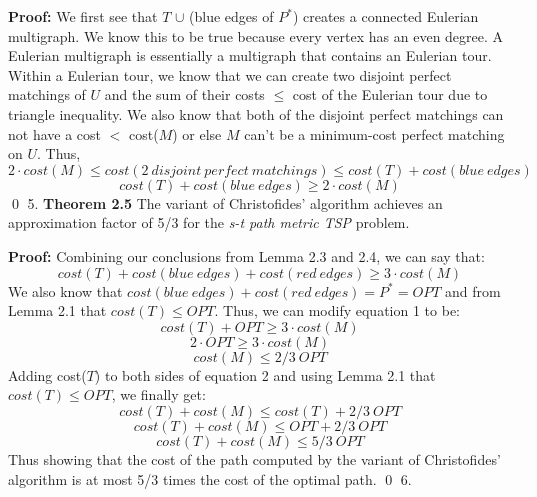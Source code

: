\documentclass[oneside]{homework} %
\begin{document}
\textbf{Proof:} We first see that $T$ $\cup$ (blue edges of $P^*$) creates a connected Eulerian multigraph. We know this to be true because every vertex has an even degree. A Eulerian multigraph is essentially a multigraph that contains an Eulerian tour. Within a Eulerian tour, we know that we can create two disjoint perfect matchings of $U$ and the sum of their costs $\leq$ cost of the Eulerian tour due to triangle inequality. We also know that both of the disjoint perfect matchings can not have a cost $<$ cost($M$) or else $M$ can't be a minimum-cost perfect matching on $U$. Thus, $$2 \cdot cost(M) \leq cost(2\ disjoint\ perfect\ matchings) \leq cost(T) + cost(blue\ edges)$$ $$cost(T) + cost(blue\ edges) \geq 2 \cdot cost(M)$$ \hfill\qed
\newline
\newline
{\large5.} \textbf{Theorem 2.5} The variant of Christofides' algorithm achieves an approximation factor of 5/3 for the \textit{s-t path metric TSP} problem.
\newline

\textbf{Proof:} Combining our conclusions from Lemma 2.3 and 2.4, we can say that: 
\begin{equation} \label{eq:1} 
cost(T) + cost(blue\ edges) + cost(red\ edges) \geq 3 \cdot cost(M)
\end{equation} 
We also know that $cost(blue\ edges) + cost(red\ edges) = P^* = OPT$ and from Lemma 2.1 that $cost(T) \leq OPT$. Thus, we can modify equation 1 to be: $$cost(T) + OPT \geq 3 \cdot cost(M)$$ $$2 \cdot OPT \geq 3 \cdot cost(M)$$
\begin{equation} \label{eq:2} 
cost(M) \leq 2/3\ OPT
\end{equation}
Adding cost($T$) to both sides of equation 2 and using Lemma 2.1 that $cost(T) \leq OPT$, we finally get: $$cost(T) + cost(M) \leq cost(T) + 2/3\ OPT$$ $$cost(T) + cost(M) \leq OPT + 2/3\ OPT$$ $$cost(T) + cost(M) \leq 5/3\ OPT$$
Thus showing that the cost of the path computed by the variant of Christofides' algorithm is at most 5/3 times the cost of the optimal path. \hfill\qed
\newpage
{\large6.}
\end{document}
